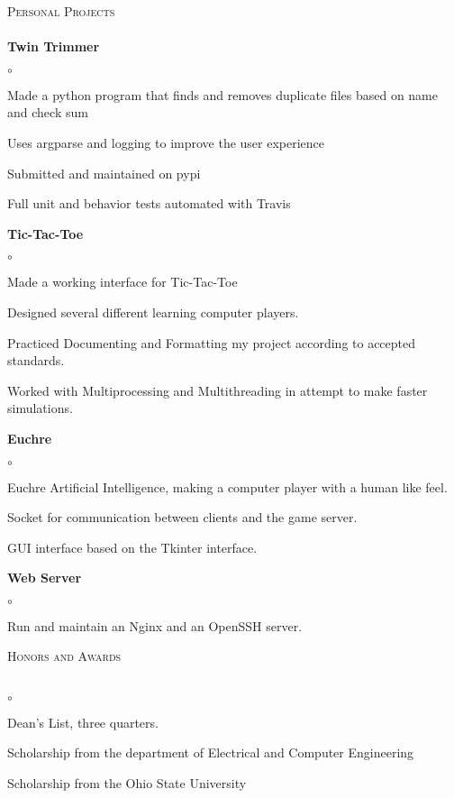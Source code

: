 \documentclass{article}
\newcommand{\lineunder}{\vspace*{-8pt} \\ \hspace*{-18pt} \hrulefill \\}
\newcommand{\header}[1]{{\hspace*{-15pt}\vspace*{6pt} \textsc{#1}} \vspace*{-6pt} \lineunder}
\newcommand{\project}[1]{{ \textbf{#1}  }}
\newenvironment{achievements}{\begin{list}{$\circ$}{\topsep 0pt \itemsep -2pt}}{\vspace*{4pt}\end{list}}
\begin{document}
\header{Personal Projects}
\project{Twin Trimmer}
	\begin{achievements}
	\item Made a python program that finds and removes duplicate files based on name and check sum
	\item Uses argparse and logging to improve the user experience
  \item Submitted and maintained on pypi
  \item Full unit and behavior tests automated with Travis
	\end{achievements}
\project{Tic-Tac-Toe}
	\begin{achievements}
	\item Made a working interface for Tic-Tac-Toe
	\item Designed several different learning computer players.
	\item Practiced Documenting and Formatting my project according to
	accepted standards.
	\item Worked with Multiprocessing and Multithreading in attempt to
	make faster simulations.
	\end{achievements}

\project{Euchre}
	\begin{achievements}
	\item Euchre Artificial Intelligence, making a computer player with
a human like feel.
	\item Socket for communication between clients and the game server.
	\item GUI interface based on the Tkinter interface.
	\end{achievements}

\project{Web Server}
	\begin{achievements}
	\item Run and maintain an Nginx and an OpenSSH server.
	\end{achievements}

\newpage

\header{Honors and Awards}
\begin{achievements}
	\item Dean's List, three quarters.
	\item Scholarship from the department of Electrical and Computer Engineering
	\item Scholarship from the Ohio State University
\end{achievements}
\end{document}
